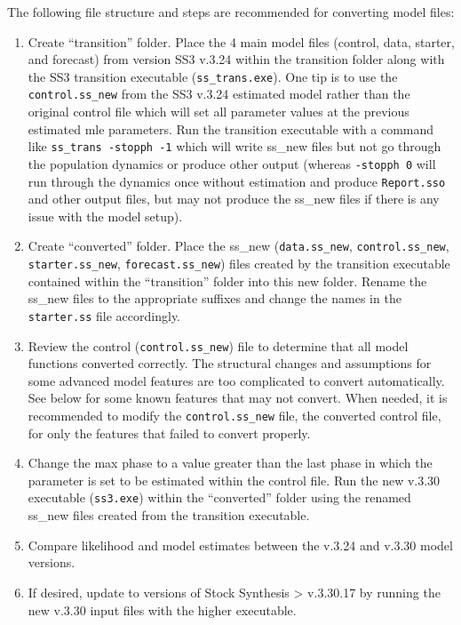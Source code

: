 The following file structure and steps are recommended for converting model files:
\begin{enumerate}
	\item Create ``transition'' folder. Place the 4 main model files (control, data, starter, and forecast) from version SS3 v.3.24 within the transition folder along with the SS3 transition executable (\texttt{ss\_trans.exe}). One tip is to use the \texttt{control.ss\_new} from the SS3 v.3.24 estimated model rather than the original control file which will set all parameter values at the previous estimated \gls{mle} parameters. Run the transition executable with a command like \texttt{ss\_trans -stopph -1} which will write ss\_new files but not go through the population dynamics or produce other output (whereas \texttt{-stopph 0} will run through the dynamics once without estimation and produce \texttt{Report.sso} and other output files, but may not produce the ss\_new files if there is any issue with the model setup).
	
	\item Create ``converted'' folder.  Place the ss\_new (\texttt{data.ss\_new}, \texttt{control.ss\_new}, \texttt{starter.ss\_new}, \texttt{forecast.ss\_new}) files created by the transition executable contained within the ``transition'' folder into this new folder. Rename the ss\_new files to the appropriate suffixes and change the names in the \texttt{starter.ss} file accordingly.
	
	\item Review the control (\texttt{control.ss\_new}) file to determine that all model functions converted correctly. The structural changes and assumptions for some advanced model features are too complicated to convert automatically. See below for some known features that may not convert. When needed, it is recommended to modify the \texttt{control.ss\_new} file, the converted control file, for only the features that failed to convert properly.
	
	\item Change the max phase to a value greater than the last phase in which the parameter is set to be estimated within the control file. Run the new v.3.30 executable (\texttt{ss3.exe}) within the ``converted'' folder using the renamed ss\_new files created from the transition executable.
	
	\item Compare likelihood and model estimates between the v.3.24 and v.3.30 model versions.
	
	\item If desired, update to versions of Stock Synthesis > v.3.30.17 by running the new v.3.30 input files with the higher executable.
\end{enumerate}

